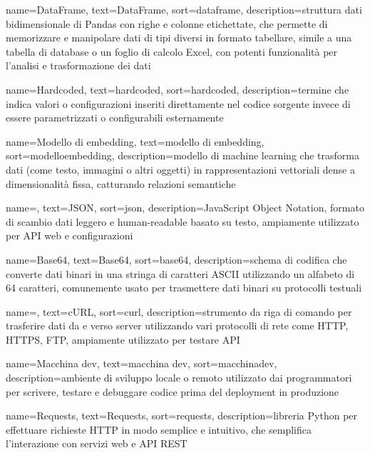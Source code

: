  {
    name=DataFrame,
    text=DataFrame,
    sort=dataframe,
    description={struttura dati bidimensionale di Pandas con righe e colonne etichettate, che permette di memorizzare e manipolare dati di tipi diversi in formato tabellare, simile a una tabella di database o un foglio di calcolo Excel, con potenti funzionalità per l'analisi e trasformazione dei dati}
}

 {
    name=Hardcoded,
    text=hardcoded,
    sort=hardcoded,
    description={termine che indica valori o configurazioni inseriti direttamente nel codice sorgente invece di essere parametrizzati o configurabili esternamente}
}

 {
    name=Modello di embedding,
    text=modello di embedding,
    sort=modelloembedding,
    description={modello di machine learning che trasforma dati (come testo, immagini o altri oggetti) in rappresentazioni vettoriali dense a dimensionalità fissa, catturando relazioni semantiche}
}

 {
    name=,
    text=JSON,
    sort=json,
    description={JavaScript Object Notation, formato di scambio dati leggero e human-readable basato su testo, ampiamente utilizzato per API web e configurazioni}
}

 {
    name=Base64,
    text=Base64,
    sort=base64,
    description={schema di codifica che converte dati binari in una stringa di caratteri ASCII utilizzando un alfabeto di 64 caratteri, comunemente usato per trasmettere dati binari su protocolli testuali}
}

 {
    name=,
    text=cURL,
    sort=curl,
    description={strumento da riga di comando per trasferire dati da e verso server utilizzando vari protocolli di rete come HTTP, HTTPS, FTP, ampiamente utilizzato per testare API}
}

 {
    name=Macchina dev,
    text=macchina dev,
    sort=macchinadev,
    description={ambiente di sviluppo locale o remoto utilizzato dai programmatori per scrivere, testare e debuggare codice prima del deployment in produzione}
}

 {
    name=Requests,
    text=Requests,
    sort=requests,
    description={libreria Python per effettuare richieste HTTP in modo semplice e intuitivo, che semplifica l'interazione con servizi web e API REST}
}

